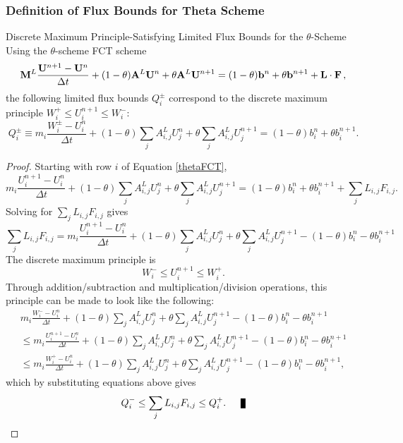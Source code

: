 \subsubsection{Definition of Flux Bounds for Theta Scheme}
\begin{theorem}{Discrete Maximum Principle-Satisfying Limited Flux Bounds for
  the $\theta$-Scheme}
  Using the $\theta$-scheme FCT scheme
  \begin{equation}\label{thetaFCT}
    \mathbf{M}^L\frac{\mathbf{U}^{n+1}-\mathbf{U}^n}{\Delta t}
    + (1-\theta)\mathbf{A}^L\mathbf{U}^n + \theta\mathbf{A}^L\mathbf{U}^{n+1}
    = (1-\theta)\mathbf{b}^n + \theta\mathbf{b}^{n+1}
    + \mathbf{L}\cdot\mathbf{F} \,,
  \end{equation}
  the following limited flux bounds $Q_i^\pm$ correspond to the discrete
   maximum principle $W_i^+\le U_i^{n+1}\le W_i^-$:
   \begin{equation}
      Q_i^\pm \equiv m_i\frac{W_i^\pm - U_i^n}{\Delta t}
      +(1-\theta)\sum\limits_j A_{i,j}^L U_j^n
      +\theta\sum\limits_j A_{i,j}^L U_j^{n+1}
      =(1-\theta)b_i^n
      +\theta b_i^{n+1}.
   \end{equation}
\end{theorem}

\begin{proof}
  Starting with row $i$ of Equation \eqref{thetaFCT},
   \[
      m_i\frac{U_i^{n+1}-U_i^n}{\Delta t}
      + (1-\theta)\sum\limits_j A_{i,j}^L U_j^n
      + \theta\sum\limits_j A_{i,j}^L U_j^{n+1}
      = (1-\theta)b_i^n
      + \theta b_i^{n+1}
      + \sum\limits_j L_{i,j}F_{i,j}.
   \]
   Solving for $\sum\limits_j L_{i,j}F_{i,j}$ gives
   \[
      \sum\limits_j L_{i,j}F_{i,j} =
      m_i\frac{U_i^{n+1}-U_i^n}{\Delta t}
      + (1-\theta)\sum\limits_j A_{i,j}^L U_j^n
      + \theta\sum\limits_j A_{i,j}^L U_j^{n+1}
      - (1-\theta)b_i^n
      - \theta b_i^{n+1}
   \]
   The discrete maximum principle is
   \[
      W_i^-\le U_i^{n+1}\le W_i^+.
   \]
   Through addition/subtraction and multiplication/division operations, this
   principle can be made to look like the following:
   \begin{multline*}
   m_i\frac{W_i^--U_i^n}{\Delta t}
      + (1-\theta)\sum\limits_j A_{i,j}^L U_j^n
      + \theta\sum\limits_j A_{i,j}^L U_j^{n+1}
      - (1-\theta)b_i^n
      - \theta b_i^{n+1}\\
   \le m_i\frac{U_i^{n+1}-U_i^n}{\Delta t}
      + (1-\theta)\sum\limits_j A_{i,j}^L U_j^n
      + \theta\sum\limits_j A_{i,j}^L U_j^{n+1}
      - (1-\theta)b_i^n
      - \theta b_i^{n+1}\\
   \le m_i\frac{W_i^+-U_i^n}{\Delta t}
      + (1-\theta)\sum\limits_j A_{i,j}^L U_j^n
      + \theta\sum\limits_j A_{i,j}^L U_j^{n+1}
      - (1-\theta)b_i^n
      - \theta b_i^{n+1},
   \end{multline*}
   which by substituting equations above gives
   \[
      Q_i^-\le\sum\limits_j L_{i,j}F_{i,j}\le Q_i^+.\qed
   \]
\end{proof}
